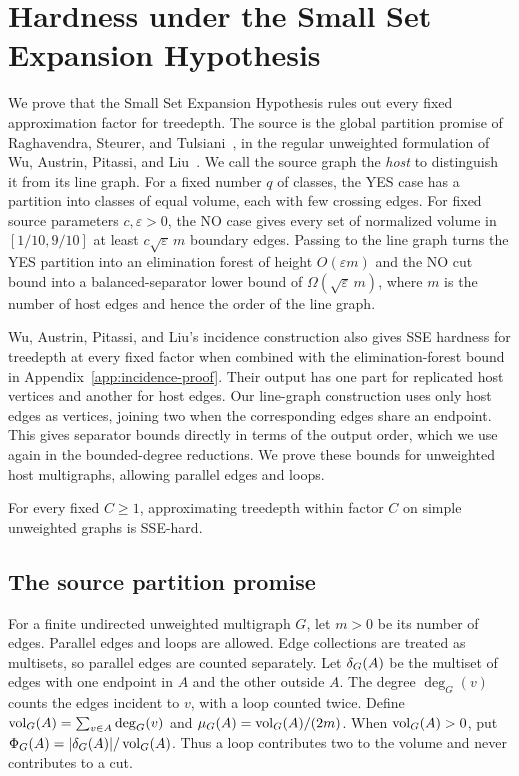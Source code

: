 \section{Hardness under the Small Set Expansion Hypothesis}
\label{sec:sseh}

We prove that the Small Set Expansion Hypothesis rules out every fixed
approximation factor for treedepth. The source is the global partition
promise of Raghavendra, Steurer, and Tulsiani~\cite{RST}, in the
regular unweighted formulation of Wu, Austrin, Pitassi, and
Liu~\cite[Section~2.5]{APW}. We call
the source graph the \emph{host} to distinguish it from its line
graph. For a fixed number $q$ of classes, the YES case has a partition
into classes of equal volume, each with few crossing edges.
For fixed source parameters $c,\varepsilon>0$, the NO case gives every
set of normalized volume in $[1/10,9/10]$ at least
$c\sqrt{\varepsilon}\,m$ boundary edges. Passing to
the line graph turns the YES partition into an elimination forest of
height $O(\varepsilon m)$ and the NO cut bound into a balanced-separator
lower bound of $\Omega(\sqrt{\varepsilon}\,m)$, where $m$ is the number
of host edges and hence the order of the line graph.

Wu, Austrin, Pitassi, and Liu's incidence construction also gives
\textup{SSE} hardness for treedepth at every fixed factor when combined with
the elimination-forest bound in Appendix~\ref{app:incidence-proof}. Their output has one
part for replicated host vertices and another for host edges. Our
line-graph construction uses only host edges as vertices, joining two
when the corresponding edges share an endpoint. This gives separator
bounds directly in terms of the output order, which we use again in
the bounded-degree reductions. We prove these bounds for unweighted host
multigraphs, allowing parallel edges and loops.

\begin{theorem}\label{thm:sse-hardness}
For every fixed $C\geq1$, approximating treedepth within factor $C$ on
simple unweighted graphs is \textup{SSE}-hard.
\end{theorem}

\subsection{The source partition promise}

For a finite undirected unweighted multigraph $G$, let $m>0$ be its
number of edges. Parallel edges and loops are allowed. Edge collections
are treated as multisets, so parallel edges are counted separately.
Let $\delta_G(A)$ be the multiset of edges with one endpoint in $A$ and
the other outside $A$. The degree $\deg_G(v)$ counts the edges incident
to $v$, with a loop counted twice.
Define $\operatorname{vol}_G(A)=\sum_{v\in A}\deg_G(v)$ and
$\mu_G(A)=\operatorname{vol}_G(A)/(2m)$. When $\operatorname{vol}_G(A)>0$, put
$\Phi_G(A)=|\delta_G(A)|/\operatorname{vol}_G(A)$. Thus a loop contributes two
to the volume and never contributes to a cut.

